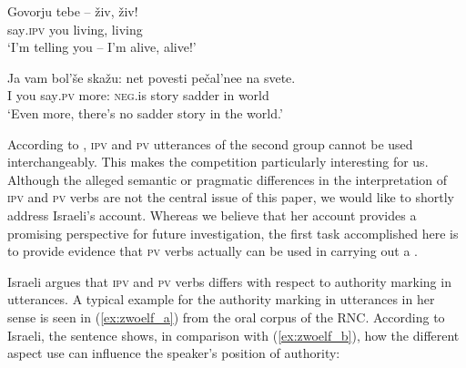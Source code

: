 \documentclass[output=paper,colorlinks,citecolor=brown,newtxmath,hidelinks]{langscibook}
\begin{document}
\ea\label{ex:zehn}
\gll  Govorju tebe -- živ, živ!\\
         say\textsc{.ipv} you {} living, living\\
\glt ‘I'm telling you -- I'm alive, alive!’
\z

\ea\label{ex:elf}
\gll Ja vam bol’še skažu: net povesti pečal’nee na svete.\\
            I   you   say\textsc{.pv}  more: \textsc{neg.}is story sadder in world\\
\glt ‘Even more, there's no sadder story in the world.’
\z

\noindent According to \citet{Israeli2001}, \textsc{ipv} and \textsc{pv}  utterances of the second group cannot be used interchangeably. This makes the  competition particularly interesting for us. Although the alleged semantic or pragmatic differences in the interpretation of \textsc{ipv} and \textsc{pv}  verbs are not the central issue of this paper, we would like to shortly address Israeli’s account. Whereas we believe that her account  provides a promising perspective for future investigation, the first task accomplished here is to provide evidence that \textsc{pv} verbs actually can be used in carrying out a .\largerpage[2]

Israeli argues that \textsc{ipv} and \textsc{pv}  verbs differs with respect to authority marking in  utterances. A typical example for the authority marking in  utterances in her sense is seen in (\ref{ex:zwoelf_a}) from the oral corpus of the RNC. According to Israeli, the sentence shows, in comparison with (\ref{ex:zwoelf_b}), how the different aspect use can influence the speaker’s position of authority:

\ea\label{ex:zwoelf} 
            \z
\z
\end{document}
